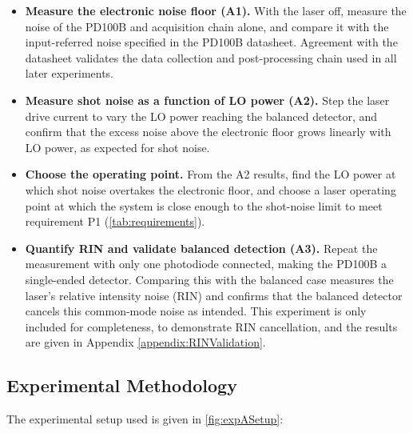  \begin{itemize}
 	\item \textbf{Measure the electronic noise floor (A1).} With the laser off, measure the
 	noise of the PD100B and acquisition chain alone, and compare it with the input-referred
 	noise specified in the PD100B datasheet. Agreement with the datasheet validates the
 	data collection and post-processing chain used in all later experiments.
 	
 	\item \textbf{Measure shot noise as a function of LO power (A2).} Step the laser drive
 	current to vary the LO power reaching the balanced detector, and confirm that the excess
 	noise above the electronic floor grows linearly with LO power, as expected for shot noise.
 	
 	\item \textbf{Choose the operating point.} From the A2 results, find the LO power at which
 	shot noise overtakes the electronic floor, and choose a laser operating point at which the
 	system is close enough to the shot-noise limit to meet requirement P1
 	(\autoref{tab:requirements}).
 	
 	\item \textbf{Quantify RIN and validate balanced detection (A3).} Repeat the measurement
 	with only one photodiode connected, making the PD100B a single-ended detector. Comparing
 	this with the balanced case measures the laser's relative intensity noise (RIN) and
 	confirms that the balanced detector cancels this common-mode noise as intended. This experiment is only included for completeness, to demonstrate RIN cancellation, and the results are given in Appendix \ref{appendix:RINValidation}.
 \end{itemize} 

 \subsection{Experimental Methodology}
 The experimental setup used is given in \autoref{fig:expASetup}:

